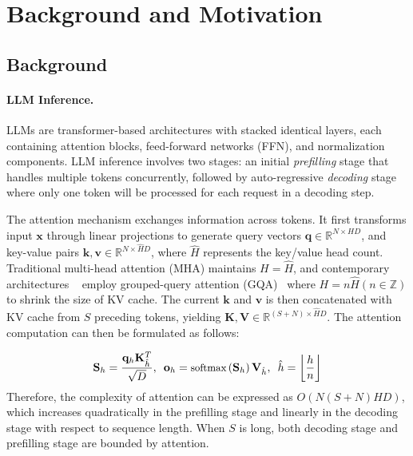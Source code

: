 \section{Background and Motivation}
\label{sect:background}



\subsection{Background}

\paragraph{LLM Inference.} LLMs are transformer-based architectures with stacked identical layers, each containing attention blocks, feed-forward networks (FFN), and normalization components. %
LLM inference involves two stages: an initial \emph{prefilling} stage that handles multiple tokens concurrently, followed by auto-regressive \emph{decoding} stage where only one token will be processed for each request in a decoding step.


 The attention mechanism exchanges information across tokens. It first transforms input $\mathbf{x}$ through linear projections to generate query vectors $\mathbf{q}\in\mathbb{R}^{N\times HD}$, and key-value pairs $\mathbf{k},\mathbf{v}\in\mathbb{R}^{N\times \hat{H}D}$, where $\hat{H}$ represents the key/value head count. Traditional multi-head attention (MHA) maintains $H = \hat{H}$, and contemporary architectures 
~\cite{touvron2023llama2,jiang2023mistral,jiang2024mixtral} employ grouped-query attention (GQA)~\cite{ainslie2023gqa}
where $H = n\hat{H} (n\in \mathbb{Z})$ to shrink the size of KV cache. The current $\mathbf{k}$ and $\mathbf{v}$ is then concatenated with KV cache from $S$ preceding tokens, yielding $\mathbf{K}, \mathbf{V}\in\mathbb{R}^{(S+N)\times \hat{H}D}$. The attention computation can then be formulated as follows:

\vspace{-14pt}
\begin{equation}
\small
\mathbf{S}_{h} = \frac{\mathbf{q}_{h}\mathbf{K}_{\hat{h}}^T}{\sqrt{D}}, 
\hspace{5pt}
\mathbf{o}_{h} = \text{softmax}\left(\mathbf{S}_{h}\right)\mathbf{V}_{\hat{h}}, 
\hspace{5pt}
\hat{h}=\left\lfloor\frac{h}{n}\right\rfloor
\label{eqn:background:attn}
\end{equation}
Therefore, the complexity of attention can be expressed as $O\left(N(S+N)HD\right)$, which increases quadratically in the prefilling stage and linearly in the decoding stage with respect to sequence length. When $S$ is long, both decoding stage and prefilling stage are bounded by attention.


